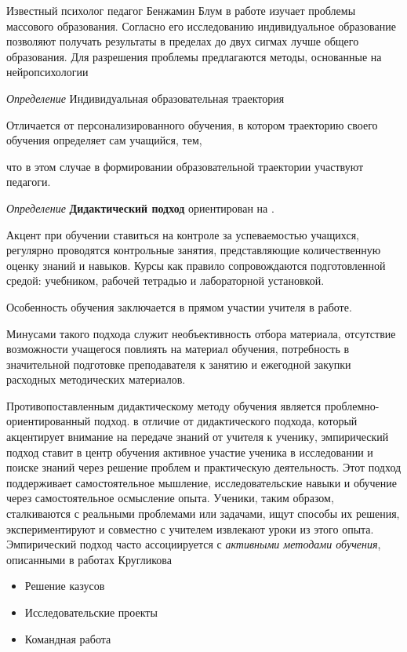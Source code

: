 Известный психолог педагог Бенжамин Блум в работе  изучает проблемы массового образования.
Согласно его исследованию индивидуальное образование позволяют получать 
результаты в пределах до двух сигмах лучше общего образования. Для разрешения проблемы
предлагаются методы, основанные на нейропсихологии


\textit{Определение} Индивидуальная образовательная
траектория 

Отличается от персонализированного обучения, в котором траекторию своего обучения определяет сам учащийся, тем, 

что в этом случае в формировании образовательной траектории участвуют педагоги.






\textit{Определение} \textbf{Дидактический подход} ориентирован на . 
 
Акцент при обучении ставиться на контроле за успеваемостью учащихся, 
регулярно проводятся контрольные занятия, представляющие количественную оценку знаний и навыков.
Курсы как правило сопровождаются подготовленной средой: учебником, рабочей тетрадью и лабораторной установкой.

Особенность обучения заключается в прямом участии учителя в работе.

Минусами такого подхода служит необъективность отбора материала,
отсутствие возможности учащегося повлиять на материал обучения, 
потребность в значительной подготовке преподавателя к занятию и ежегодной закупки расходных методических материалов.

Противопоставленным дидактическому методу обучения является проблемно-ориентированный подход.
в отличие от дидактического подхода, который акцентирует внимание на передаче знаний от учителя к ученику,
эмпирический подход ставит в центр обучения активное участие ученика в исследовании
и поиске знаний через решение проблем и практическую деятельность.
Этот подход поддерживает самостоятельное мышление, исследовательские навыки и обучение через самостоятельное осмысление опыта.
Ученики, таким образом, сталкиваются с реальными проблемами или задачами, 
ищут способы их решения, экспериментируют и совместно с учителем извлекают уроки из этого опыта.
Эмпирический подход часто ассоциируется с \textit{активными методами обучения}, описанными в работах Кругликова \cite{кругликов2006деловые}

\begin{itemize}
    \item Решение казусов
    \item Исследовательские проекты
    \item Командная работа
\end{itemize}

